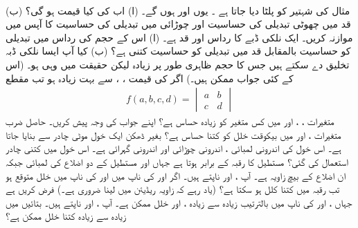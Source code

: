 \\
مثال  کی شہتیر کو پلٹا دیا جاتا ہے  ۔ یوں   اور  ہوں گے۔ (ا) اب  کی کیا قیمت ہو گی؟ (ب) قد میں چھوٹی تبدیلی کی حساسیت     اور  چوڑائی میں تبدیلی  کی  حساسیت کا آپس میں  موازنہ کریں۔  
ایک نلکی ڈبے کا رداس  اور قد  ہے۔ (ا)  اس کے  حجم کی    رداس میں تبدیلی کو حساسیت  بالمقابل قد میں تبدیلی   کو  حساسیت کتنی  ہے؟ (ب)  کیا آپ ایسا نلکی ڈبہ تخلیق دے سکتے ہیں جس کا حجم  ظاہری طور پر زیادہ   لیکن حقیقت میں  وہی ہو۔ (اس کے کئی جواب ممکن ہیں۔)
اگر  کی قیمت ، ،  سے بہت زیادہ ہو تب   مقطع 
\begin{align*}
f(a,b,c,d)=\begin{vmatrix}a&b\\ c&d \end{vmatrix}
\end{align*}
متغیرات ، ،  اور  میں کس متغیر کو زیادہ حساس ہے؟ اپنے جواب  کی وجہ پیش کریں۔
حاصل ضرب  متغیرات ،  اور  میں بیکوقت   خلل  کو کتنا حساس ہے؟
بغیر ڈھکن ایک خول      موٹی چادر سے بنایا جاتا ہے۔ اس خول کی اندرونی لمبائی ،  اندرونی چوڑائی  اور اندرونی گہرائی  ہے۔ اس خول میں کتنی چادر استعمال کی گئی؟
مستطیل کا رقبہ   کے برابر ہوتا ہے جہاں  اور  مستطیل کے دو اضلاع کی لمبائی جبکہ  ان  اضلاع  کے بیچ زاویہ ہے۔ آپ ،
  اور  ناپتے ہیں۔ اگر  اور  کی ناپ میں  اور  کی ناپ میں   خلل متوقع ہو تب  رقبہ میں کتنا کلل ہو سکتا ہے؟ (یاد رہے کہ زاویہ   ریڈیئن میں لینا ضروری ہے۔) 
فرض کریں  ہے جہاں ،  اور  کی ناپ میں بالترتیب زیادہ سے زیادہ ،  اور  خلل ممکن ہے۔ آپ ،  اور  ناپتے ہیں۔ بتائیں   میں  زیادہ سے زیادہ کتنا خلل ممکن ہے؟
